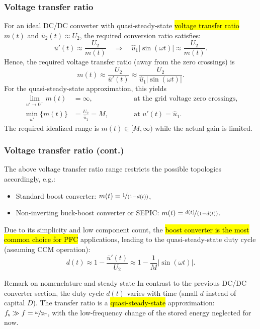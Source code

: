 \begin{frame}
	\frametitle{Voltage transfer ratio}
	For an ideal DC/DC converter with quasi-steady-state \hl{voltage transfer ratio} $m(t)$ and $\overline{u}_2(t)\approx U_2$, the required conversion ratio satisfies:
	\begin{equation}
		\overline{u}'(t) \approx \frac{U_2}{m(t)} \quad \Rightarrow \quad \hat{u}_1|\sin(\omega t)| \approx \frac{U_2}{m(t)}.
	\end{equation}\pause
	Hence, the required voltage transfer ratio (away from the zero crossings) is
	\begin{equation}
		m(t)\approx \frac{U_2}{\overline{u}'(t)}\approx \frac{U_2}{\hat{u}_1|\sin(\omega t)|}.
	\end{equation}\pause
	For the quasi-steady-state approximation, this yields
	\begin{equation}
		\begin{alignedat}{2}
			\lim_{u'\to0^+}m(t) & =\infty,\qquad                  &  & \text{at the grid voltage zero crossings}, \\
			\min_{u'}\{m(t)\}   & =\frac{U_2}{\hat{u}_1}=M,\qquad &  & \text{at }u'(t)=\hat{u}_1.
		\end{alignedat}
	\end{equation}\pause
	The required idealized range is $m(t)\in[M,\infty)$ while the actual gain is limited.
\end{frame}

\begin{frame}
	\frametitle{Voltage transfer ratio (cont.)}
	The above voltage transfer ratio range restricts the possible topologies accordingly, e.g.:
	\begin{itemize}
		\item Standard boost converter: $m(t)=\nicefrac{1}{(1-d(t))}$,
		\item Non-inverting buck-boost converter or SEPIC: $m(t)=\nicefrac{d(t)}{(1-d(t))}$.
	\end{itemize}\pause
	Due to its simplicity and low component count, the \hl{boost converter is the most common choice for PFC} applications, leading to the quasi-steady-state duty cycle (assuming CCM operation):
	\begin{equation}
		d(t)\approx 1-\frac{\overline{u}'(t)}{U_2}\approx 1-\frac{1}{M}|\sin(\omega t)|.
		\label{eq:PFC_duty_cycle_feed_forward}
	\end{equation}\pause
	\begin{varblock}{Remark on nomenclature and steady state}
		In contrast to the previous DC/DC converter section, the duty cycle $d(t)$ varies with time (small $d$ instead of capital $D$). The transfer ratio is a \hl{quasi-steady-state} approximation: $f_\mathrm{s}\gg f=\nicefrac{\omega}{2\pi}$, with the low-frequency change of the stored energy neglected for now.
	\end{varblock}
\end{frame}

